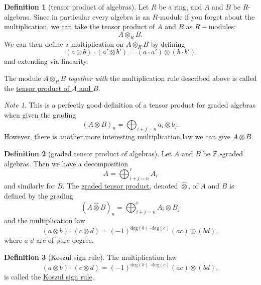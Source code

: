 \documentclass[a4paper,10pt]{scrreprt}
\newcommand{\Z}{\mathbb{Z}}
\newcommand{\defn}[1]{\ul{#1}}
\theoremstyle{definition}
\newtheorem{definition}{Definition}[section]
\theoremstyle{plain}
\theoremstyle{remark}
\newtheorem{note}{Note}[section]
\begin{document}
\begin{definition}[tensor product of algebras]
  \label{def:tensorproductofalgebras}
  Let $R$ be a ring, and $A$ and $B$ be $R$-algebras. Since in particular every algebra is an $R$-module if you forget about the multiplication, we can take the tensor product of $A$ and $B$ as $R-$modules:
  \begin{equation*}
    A \otimes_{R} B.
  \end{equation*}
  We can then define a multiplication on $A \otimes_{R} B$ by defining
  \begin{equation*}
    (a \otimes b) \cdot (a' \otimes b') = (a \cdot a') \otimes (b \cdot b')
  \end{equation*}
  and extending via linearity.

  The module $A \otimes_{R} B$ \emph{together with} the multiplication rule described above is called the \defn{tensor product of $A$ and $B$}.
\end{definition}
\begin{note}
  This is a perfectly good definition of a tensor product for graded algebras when given the grading
  \begin{equation*}
    (A\otimes B)_{n} = \bigoplus_{i+j=n} a_{i} \otimes b_{j}.
  \end{equation*}
  However, there is another more interesting multiplication law we can give $A \otimes B$.
\end{note}

\begin{definition}[graded tensor product of algebras]
  \label{def:gradedtensorproduct}
  Let $A$ and $B$ be $\Z_{r}$-graded algebras. Then we have a decomposition
  \begin{equation*}
    A = \bigoplus_{i+j=n}^{r} A_{i}
  \end{equation*}
  and similarly for $B$. The \defn{graded tensor product}, denoted $\hat{\otimes}$, of $A$ and $B$ is defined by the grading
  \begin{equation*}
    (A \hat{\otimes} B)_{n} = \bigoplus_{i+j=n}^{r} A_{i} \otimes B_{j}
  \end{equation*}
  and the multiplication law 
  \begin{equation*}
    (a \otimes b)\cdot(c \otimes d) = (-1)^{\mathrm{deg}(b)\cdot\mathrm{deg}(c)}(ac)\otimes(bd),
  \end{equation*}
  where $a$-$d$ are of pure degree. 
\end{definition}

\begin{definition}[Koszul sign rule]
  \label{def:koszulsignrule}
  The multiplication law
  \begin{equation*}
    (a \otimes b)\cdot(c \otimes d) = (-1)^{\mathrm{deg}(b)\cdot\mathrm{deg}(c)}(ac)\otimes(bd),
  \end{equation*}
  is called the \defn{Koszul sign rule}.
\end{definition}
\end{document}
